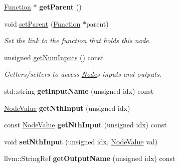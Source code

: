 \begin{DoxyCompactItemize}
\hyperlink{classglow_1_1_function}{Function} $\ast$ {\bfseries get\+Parent} ()
\item 
\mbox{\label{classglow_1_1_node_ab320e5e60178b9a7913c0a816109a0fd}} 
void \hyperlink{classglow_1_1_node_ab320e5e60178b9a7913c0a816109a0fd}{set\+Parent} (\hyperlink{classglow_1_1_function}{Function} $\ast$parent)
\begin{DoxyCompactList}\small\item\em Set the link to the function that holds this node. \end{DoxyCompactList}\item 
\mbox{\label{classglow_1_1_node_a8b5702e4c8358c22a904cc3f874b1dc9}} 
unsigned \hyperlink{classglow_1_1_node_a8b5702e4c8358c22a904cc3f874b1dc9}{get\+Num\+Inputs} () const
\begin{DoxyCompactList}\small\item\em Getters/setters to access \hyperlink{classglow_1_1_node}{Node}\textquotesingle{}s inputs and outputs. \end{DoxyCompactList}\item 
\mbox{\label{classglow_1_1_node_afed63a8a5fcbcb158cb8e2765da8f9d6}} 
std\+::string {\bfseries get\+Input\+Name} (unsigned idx) const
\item 
\mbox{\label{classglow_1_1_node_ad62cc118b0b1c8a9e23e6d431c41a11c}} 
\hyperlink{structglow_1_1_node_value}{Node\+Value} {\bfseries get\+Nth\+Input} (unsigned idx)
\item 
\mbox{\label{classglow_1_1_node_ab1daab7e145aa2f9dc9c7a68fd17cfda}} 
const \hyperlink{structglow_1_1_node_value}{Node\+Value} {\bfseries get\+Nth\+Input} (unsigned idx) const
\item 
\mbox{\label{classglow_1_1_node_a551df6e3d3985f7746f30874b8e96a37}} 
void {\bfseries set\+Nth\+Input} (unsigned idx, \hyperlink{structglow_1_1_node_value}{Node\+Value} val)
\item 
\mbox{\label{classglow_1_1_node_a5ff71bc7d431207970d996b14782b0db}} 
llvm\+::\+String\+Ref {\bfseries get\+Output\+Name} (unsigned idx) const
\item 
\mbox{\label{classglow_1_1_node_abac711f231a8c8eb69954a0502281d22}} 

\end{DoxyCompactItemize}
